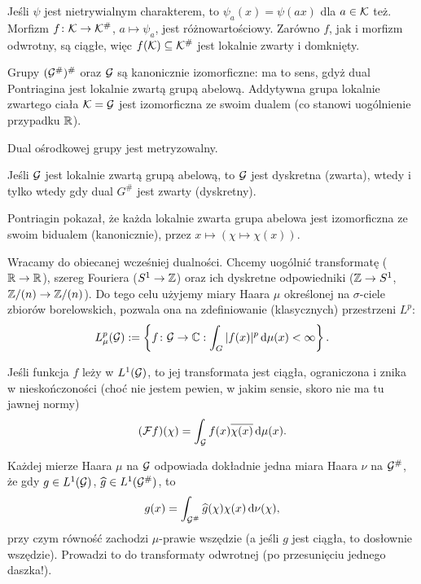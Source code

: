 \begin{fakt}
	Jeśli $\psi$ jest nietrywialnym charakterem, to $\psi_a(x) = \psi(ax)$ dla $a \in \mathcal K$ też.
	Morfizm $f \colon \mathcal K \to \mathcal K^\#$, $a \mapsto \psi_a$, jest różnowartościowy.
	Zarówno $f$, jak i morfizm odwrotny, są ciągłe, więc $f(\mathcal K) \subseteq \mathcal K^\#$ jest lokalnie zwarty i domknięty.
\end{fakt}

\begin{fakt}
	Grupy $(\mathcal G^\#)^\#$ oraz $\mathcal G$ są kanonicznie izomorficzne: ma to sens, gdyż dual Pontriagina jest lokalnie zwartą grupą abelową.
	Addytywna grupa lokalnie zwartego ciała $\mathcal K = \mathcal G$ jest izomorficzna ze swoim dualem (co stanowi uogólnienie przypadku $\mathbb R$).
\end{fakt}

\begin{fakt} 
	Dual  ośrodkowej grupy jest metryzowalny.
\end{fakt}

\begin{fakt}
	Jeśli $\mathcal G$ jest lokalnie zwartą grupą abelową, to $\mathcal G$ jest dyskretna (zwarta), wtedy i tylko wtedy gdy dual $G^\#$ jest zwarty (dyskretny).
\end{fakt}

Pontriagin pokazał, że każda lokalnie zwarta grupa abelowa jest izomorficzna ze swoim bidualem (kanonicznie), przez $x \mapsto (\chi \mapsto \chi(x))$.

Wracamy do obiecanej wcześniej dualności.
Chcemy uogólnić transformatę ($\mathbb R \to \mathbb R$), szereg Fouriera ($S^1 \to \mathbb Z$) oraz ich dyskretne odpowiedniki ($\mathbb Z \to S^1$, $\mathbb Z/(n) \to \mathbb Z/(n)$).
Do tego celu użyjemy miary Haara $\mu$ określonej na $\sigma$-ciele zbiorów borelowskich, pozwala ona na zdefiniowanie (klasycznych) przestrzeni $L^p$:
\[
	L_\mu^p(\mathcal G) := \left\{f \colon \mathcal G \to \mathbb C : \int_G |f(x)|^p \,\textrm{d} \mu (x) < \infty\right\}.
\]

\begin{definicja}
	Jeśli funkcja $f$ leży w $L^1(\mathcal G)$, to jej transformata jest ciągła, ograniczona i znika w nieskończoności (choć nie jestem pewien, w jakim sensie, skoro nie ma tu jawnej normy)
	\[
		(\mathcal F f)(\chi) = \int_\mathcal G f(x) \overline{\chi (x)} \,\textrm{d}\mu(x).
	\]
\end{definicja}

Każdej mierze Haara $\mu$ na $\mathcal G$ odpowiada dokładnie jedna miara Haara $\nu$ na $\mathcal G^\#$, że gdy $g \in L^1(\mathcal G)$, $\widehat g \in L^1(\mathcal G^\#)$, to
\[
	g(x) = \int_{\mathcal G^\#} \widehat g(\chi) \chi(x) \,\textrm{d} \nu(\chi),
\]
przy czym równość zachodzi $\mu$-prawie wszędzie (a jeśli $g$ jest ciągła, to dosłownie wszędzie).
Prowadzi to do transformaty odwrotnej (po przesunięciu jednego daszka!).

